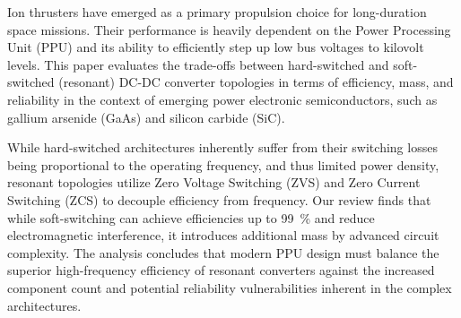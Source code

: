 Ion thrusters have emerged as a primary propulsion choice for long-duration space missions. Their performance is heavily dependent on the Power Processing Unit (PPU) and its ability to efficiently step up low bus voltages to kilovolt levels. This paper evaluates the trade-offs between hard-switched and soft-switched (resonant) DC-DC converter topologies in terms of efficiency, mass, and reliability in the context of emerging power electronic semiconductors, such as gallium arsenide (GaAs) and silicon carbide (SiC).

While hard-switched architectures inherently suffer from their switching losses being proportional to the operating frequency, and thus limited power density, resonant topologies utilize Zero Voltage Switching (ZVS) and Zero Current Switching (ZCS) to decouple efficiency from frequency. Our review finds that while soft-switching can achieve efficiencies up to 99~\% and reduce electromagnetic interference, it introduces additional mass by advanced circuit complexity. The analysis concludes that modern PPU design must balance the superior high-frequency efficiency of resonant converters against the increased component count and potential reliability vulnerabilities inherent in the complex architectures.